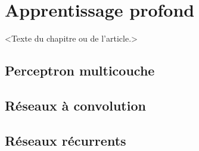 \chapter{Apprentissage profond}     %
\label{chap:reseaux_neurones}                   %

<Texte du chapitre ou de l'article.>

\section{Perceptron multicouche}

\section{Réseaux à convolution}

\section{Réseaux récurrents}